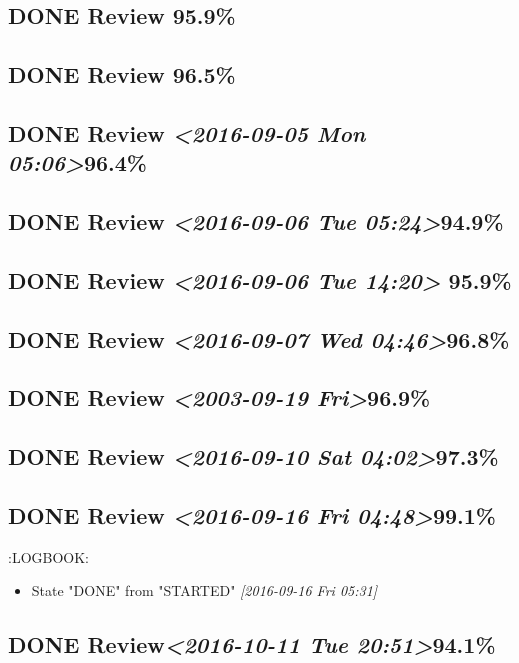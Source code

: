 \documentclass[11pt]{ctexart}
\begin{document}
\subsection{{\bfseries\sffamily DONE} Review 95.9\%}
\label{sec:orgcd332ab}
\subsection{{\bfseries\sffamily DONE} Review 96.5\%}
\label{sec:org1151f0f}
\subsection{{\bfseries\sffamily DONE} Review \textit{<2016-09-05 Mon 05:06>}96.4\%}
\label{sec:orgb593350}
\subsection{{\bfseries\sffamily DONE} Review \textit{<2016-09-06 Tue 05:24>}94.9\%}
\label{sec:org5dc1f52}
\subsection{{\bfseries\sffamily DONE} Review \textit{<2016-09-06 Tue 14:20> } 95.9\%}
\label{sec:orgfdf7f01}
\subsection{{\bfseries\sffamily DONE} Review \textit{<2016-09-07 Wed 04:46>}96.8\%}
\label{sec:orgb1c0cd9}
\subsection{{\bfseries\sffamily DONE} Review \textit{<2003-09-19 Fri>}96.9\%}
\label{sec:org539beb0}
\subsection{{\bfseries\sffamily DONE} Review \textit{<2016-09-10 Sat 04:02>}97.3\%}
\label{sec:orga5d1e28}
\subsection{{\bfseries\sffamily DONE} Review \textit{<2016-09-16 Fri 04:48>}99.1\%}
\label{sec:org23f0870}
:LOGBOOK:
\begin{itemize}
\item State "DONE"       from "STARTED"    \textit{[2016-09-16 Fri 05:31]}
\end{itemize}
\subsection{{\bfseries\sffamily DONE} Review\textit{<2016-10-11 Tue 20:51>}94.1\%}
\label{sec:org0a13fec}
\end{document}
